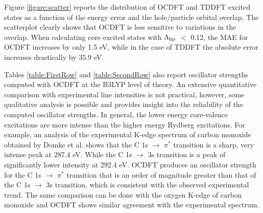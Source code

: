 \documentclass[12pt]{article}
\newcommand{\hilight}[1]{\begin{mdframed}[hidealllines=true,backgroundcolor=yellow] {#1} \end{mdframed}}
\begin{document}
Figure \ref{figure:scatter} reports the distribution of OCDFT and TDDFT excited states as a function of the energy error and the hole/particle orbital overlap. The scatterplot clearly shows that OCDFT is less sensitive to variations in the overlap. When calculating core excited states with $\Lambda_{\rm hp}$ $<$ 0.12, the MAE for OCDFT increases by only 1.5 eV, while in the case of TDDFT the absolute error increases drastically by 35.9 eV.
\hilight{Tables \ref{table:FirstRow} and \ref{table:SecondRow} also report oscillator strengths computed with OCDFT at the B3LYP level of theory. An extensive quantitative comparison with experimental line intensities is not practical, however, some qualitative analysis is possible and provides insight into the reliability of the computed oscillator strengths. In general, the lower energy core-valence excitations are more intense than the higher energy Rydberg excitations. For example, an analysis of the experimental K-edge spectrum of carbon monoxide obtained by Domke et al.\cite{domke_carbon_1990} shows that the C 1s $\rightarrow$ $\pi^*$ transition is a sharp, very intense peak at 287.4 eV. While the C 1s $\rightarrow$ 3s transition is a peak of significantly lower intensity at 292.4 eV. OCDFT produces an oscillator strength for the C 1s $\rightarrow$ $\pi^*$ transition that is an order of magnitude greater than that of the C 1s $\rightarrow$ 3s transition, which is consistent with the observed experimental trend. The same comparison can be done with the oxygen K-edge of carbon monoxide and OCDFT shows similar agreement with the experimental spectrum.
}
\end{document}
